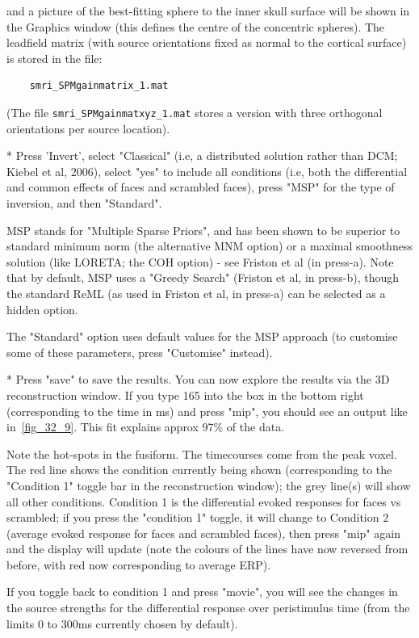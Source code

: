 and a picture of the best-fitting sphere to the inner skull surface will be shown in the Graphics window (this defines the centre of the concentric spheres). The leadfield matrix (with source orientations fixed as normal to the cortical surface) is stored in the file:
\begin{verbatim}
    smri_SPMgainmatrix_1.mat
\end{verbatim}
(The file \verb!smri_SPMgainmatxyz_1.mat! stores a version with three orthogonal orientations per source location).

* Press 'Invert', select "Classical" (i.e, a distributed solution rather than DCM; Kiebel et al, 2006), select "yes" to include all conditions (i.e, both the differential and common effects of faces and scrambled faces), press "MSP" for the type of inversion, and then "Standard".

MSP stands for "Multiple Sparse Priors", and has been shown to be superior to standard minimum norm (the alternative MNM option) or a maximal smoothness solution (like LORETA; the COH option) - see Friston et al (in press-a). Note that by default, MSP uses a "Greedy Search" (Friston et al, in press-b), though the standard ReML (as used in Friston et al, in press-a) can be selected as a hidden option.

The "Standard" option uses default values for the MSP approach (to customise some of these parameters, press "Customise" instead).

* Press "save" to save the results. You can now explore the results via the 3D reconstruction window. If you type 165 into the box in the bottom right (corresponding to the time in ms) and press "mip", you should see an output like in~\ref{fig_32_9}. This fit explains approx 97\% of the data.

Note the hot-spots in the fusiform. The timecourses come from the peak voxel. The red line shows the condition currently being shown (corresponding to the "Condition 1" toggle bar in the reconstruction window); the grey line(s) will show all other conditions. Condition 1 is the differential evoked responses for faces vs scrambled; if you press the "condition 1" toggle, it will change to Condition 2 (average evoked response for faces and scrambled faces), then press "mip" again and the display will update (note the colours of the lines have now reversed from before, with red now corresponding to average ERP).

If you toggle back to condition 1 and press "movie", you will see the changes in the source strengths for the differential response over peristimulus time (from the limits 0 to 300ms currently chosen by default).

